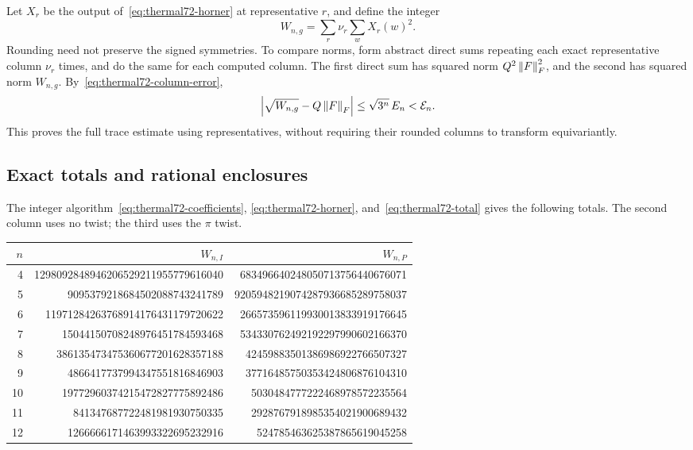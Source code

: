 Let \(X_r\) be the output of~\eqref{eq:thermal72-horner} at representative
\(r\), and define the integer
\begin{equation}\label{eq:thermal72-total}
 W_{n,g}=\sum_r\nu_r\sum_w X_r(w)^2.
\end{equation}
Rounding need not preserve the signed symmetries. To compare norms,
form abstract direct sums repeating each exact representative column
\(\nu_r\) times, and do the same for each computed column.
The first direct sum has squared norm \(Q^2\left\lVert F\right\rVert_F^2\), and the second
has squared norm \(W_{n,g}\). By~\eqref{eq:thermal72-column-error},
\begin{equation}\label{eq:thermal72-frobenius}
 \left|\sqrt{W_{n,g}}-Q\left\lVert F\right\rVert_F\right|
 \le\sqrt{3^n}\,E_n<\mathcal E_n.
\end{equation}
This proves the full trace estimate using representatives, without
requiring their rounded columns to transform equivariantly.

\subsection{Exact totals and rational enclosures}

The integer algorithm~\eqref{eq:thermal72-coefficients},
\eqref{eq:thermal72-horner}, and~\eqref{eq:thermal72-total} gives the
following totals. The second column uses no twist; the third uses the
\(\pi\) twist.
\begin{center}
\begingroup
\footnotesize
\setlength{\tabcolsep}{4pt}
\begin{tabular}{r|rr}
\(n\)&\(W_{n,I}\)&\(W_{n,P}\)\\ \hline
4&1298092848946206529211955779616040&683496640248050713756440676071\\
5&9095379218684502088743241789&9205948219074287936685289758037\\
6&11971284263768914176431179720622&266573596119930013833919176645\\
7&15044150708248976451784593468&534330762492192297990602166370\\
8&386135473475360677201628357188&42459883501386986922766507327\\
9&4866417737994347551816846903&37716485750353424806876104310\\
10&19772960374215472827775892486&5030484777222468978572235564\\
11&841347687722481981930750335&2928767918985354021900689432\\
12&1266666171463993322695232916&524785463625387865619045258
\end{tabular}
\endgroup
\end{center}

